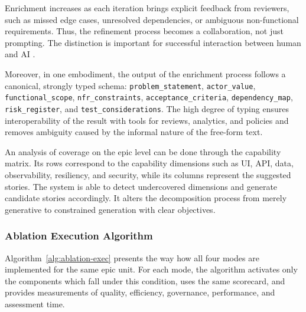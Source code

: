 \documentclass[manuscript,review]{acmart}
\begin{document}
Enrichment increases as each iteration brings explicit feedback from reviewers, such as missed edge cases, unresolved dependencies, or ambiguous non-functional requirements. Thus, the refinement process becomes a collaboration, not just prompting. The distinction is important for successful interaction between human and AI \cite{R56,R57}.

Moreover, in one embodiment, the output of the enrichment process follows a canonical, strongly typed schema:\linebreak
\texttt{problem\_statement}, \texttt{actor\_value}, \texttt{functional\_scope}, \texttt{nfr\_constraints}, \texttt{acceptance\_criteria},\linebreak
\texttt{dependency\_map}, \texttt{risk\_register}, and \texttt{test\_considerations}. The high degree of typing ensures interoperability of the result with tools for reviews, analytics, and policies and removes ambiguity caused by the informal nature of the free-form text.

An analysis of coverage on the epic level can be done through the capability matrix. Its rows correspond to the capability dimensions such as UI, API, data, observability, resiliency, and security, while its columns represent the suggested stories. The system is able to detect undercovered dimensions and generate candidate stories accordingly. It alters the decomposition process from merely generative to constrained generation with clear objectives.

\subsubsection{Ablation Execution Algorithm}
Algorithm~\ref{alg:ablation-exec} presents the way how all four modes are implemented for the same epic unit. For each mode, the algorithm activates only the components which fall under this condition, uses the same scorecard, and provides measurements of quality, efficiency, governance, performance, and assessment time.
\end{document}

